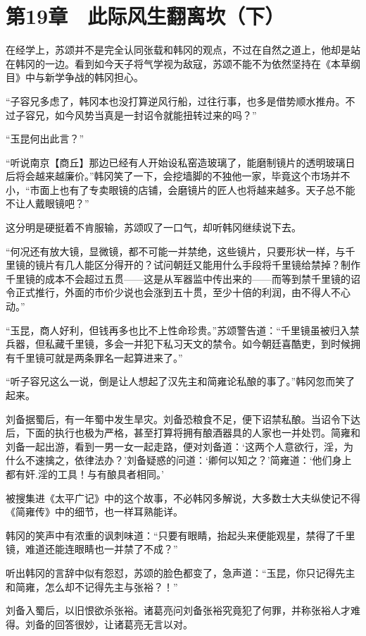\section{第19章　此际风生翻离坎（下）}

在经学上，苏颂并不是完全认同张载和韩冈的观点，不过在自然之道上，他却是站在韩冈的一边。看到如今天子将气学视为敌寇，苏颂不能不为依然坚持在《本草纲目》中与新学争战的韩冈担心。

“子容兄多虑了，韩冈本也没打算逆风行船，过往行事，也多是借势顺水推舟。不过子容兄，如今风势当真是一封诏令就能扭转过来的吗？”

“玉昆何出此言？”

“听说南京【商丘】那边已经有人开始设私窑造玻璃了，能磨制镜片的透明玻璃日后将会越来越廉价。”韩冈笑了一下，会挖墙脚的不独他一家，毕竟这个市场并不小，“市面上也有了专卖眼镜的店铺，会磨镜片的匠人也将越来越多。天子总不能不让人戴眼镜吧？”

这分明是硬挺着不肯服输，苏颂叹了一口气，却听韩冈继续说下去。

“何况还有放大镜，显微镜，都不可能一并禁绝，这些镜片，只要形状一样，与千里镜的镜片有几人能区分得开的？试问朝廷又能用什么手段将千里镜给禁掉？制作千里镜的成本不会超过五贯——这是从军器监中传出来的——而等到禁千里镜的诏令正式推行，外面的市价少说也会涨到五十贯，至少十倍的利润，由不得人不心动。”

“玉昆，商人好利，但钱再多也比不上性命珍贵。”苏颂警告道：“千里镜虽被归入禁兵器，但私藏千里镜，多会一并犯下私习天文的禁令。如今朝廷喜酷吏，到时候拥有千里镜可就是两条罪名一起算进来了。”

“听子容兄这么一说，倒是让人想起了汉先主和简雍论私酿的事了。”韩冈忽而笑了起来。

刘备据蜀后，有一年蜀中发生旱灾。刘备恐粮食不足，便下诏禁私酿。当诏令下达后，下面的执行也极为严格，甚至打算将拥有酿酒器具的人家也一并处罚。简雍和刘备一起出游，看到一男一女一起走路，便对刘备道：‘这两个人意欲行，淫，为什么不速擒之，依律法办？’刘备疑惑的问道：‘卿何以知之？’简雍道：‘他们身上都有奸.淫的工具！与有酿具者相同。’

被搜集进《太平广记》中的这个故事，不必韩冈多解说，大多数士大夫纵使记不得《简雍传》中的细节，也一样耳熟能详。

韩冈的笑声中有浓重的讽刺味道：“只要有眼睛，抬起头来便能观星，禁得了千里镜，难道还能连眼睛也一并禁了不成？”

听出韩冈的言辞中似有怨怼，苏颂的脸色都变了，急声道：“玉昆，你只记得先主和简雍，怎么却不记得先主与张裕？！”

刘备入蜀后，以旧恨欲杀张裕。诸葛亮问刘备张裕究竟犯了何罪，并称张裕人才难得。刘备的回答很妙，让诸葛亮无言以对。

